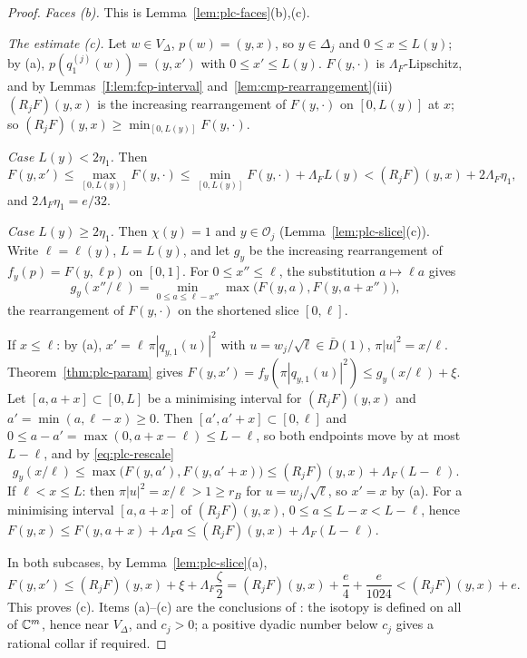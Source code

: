 \begin{proof}
\emph{Faces (b).} This is Lemma~\ref{lem:plc-faces}(b),(c).

\emph{The estimate (c).} Let $w\in V_\Delta$, $p(w)=(y,x)$, so $y\in\Delta_j$ and $0\le x\le L(y)$; by (a), $p(q^{(j)}_1(w))=(y,x')$ with $0\le x'\le L(y)$.
$F(y,\cdot)$ is $\Lambda_F$-Lipschitz, and by Lemmas~\ref{I:lem:fcp-interval} and~\ref{lem:cmp-rearrangement}(iii) $(R_jF)(y,x)$ is the increasing rearrangement of
$F(y,\cdot)$ on $[0,L(y)]$ at $x$; so $(R_jF)(y,x)\ge\min_{[0,L(y)]}F(y,\cdot)$.

\emph{Case $L(y)<2\eta_1$.} Then
\[
 F(y,x')\le\max_{[0,L(y)]}F(y,\cdot)\le\min_{[0,L(y)]}F(y,\cdot)+\Lambda_FL(y)<(R_jF)(y,x)+2\Lambda_F\eta_1,
\]
and $2\Lambda_F\eta_1=e/32$.

\emph{Case $L(y)\ge2\eta_1$.} Then $\chi(y)=1$ and $y\in\mathcal O_j$ (Lemma~\ref{lem:plc-slice}(c)). Write $\ell=\ell(y)$, $L=L(y)$, and let
$g_y$ be the increasing rearrangement of $f_y(p)=F(y,\ell p)$ on $[0,1]$. For $0\le x''\le\ell$, the substitution $a\mapsto\ell a$ gives
\begin{equation}\label{eq:plc-rescale}
 g_y(x''/\ell)=\min_{0\le a\le\ell-x''}\max\bigl(F(y,a),F(y,a+x'')\bigr),
\end{equation}
the rearrangement of $F(y,\cdot)$ on the shortened slice $[0,\ell]$.

If $x\le\ell$: by (a), $x'=\ell\,\pi|q_{y,1}(u)|^2$ with $u=w_j/\sqrt\ell\in\bar D(1)$, $\pi|u|^2=x/\ell$. Theorem~\ref{thm:plc-param} gives
$F(y,x')=f_y(\pi|q_{y,1}(u)|^2)\le g_y(x/\ell)+\xi$. Let $[a,a+x]\subset[0,L]$ be a minimising interval for $(R_jF)(y,x)$ and
$a'=\min(a,\ell-x)\ge0$. Then $[a',a'+x]\subset[0,\ell]$ and $0\le a-a'=\max(0,a+x-\ell)\le L-\ell$, so both
endpoints move by at most $L-\ell$, and by \eqref{eq:plc-rescale}
\[
 g_y(x/\ell)\le\max\bigl(F(y,a'),F(y,a'+x)\bigr)\le(R_jF)(y,x)+\Lambda_F(L-\ell).
\]
If $\ell<x\le L$: then $\pi|u|^2=x/\ell>1\ge r_B$ for $u=w_j/\sqrt\ell$, so $x'=x$ by (a). For a minimising interval $[a,a+x]$ of
$(R_jF)(y,x)$, $0\le a\le L-x<L-\ell$, hence $F(y,x)\le F(y,a+x)+\Lambda_Fa\le(R_jF)(y,x)+\Lambda_F(L-\ell)$.

In both subcases, by Lemma~\ref{lem:plc-slice}(a),
\[
 F(y,x')\le(R_jF)(y,x)+\xi+\Lambda_F\frac\zeta2=(R_jF)(y,x)+\frac e4+\frac e{1024}<(R_jF)(y,x)+e .
\]
This proves (c). Items (a)--(c) are the conclusions of : the isotopy is defined on all
of $\mathbb{C}^m$, hence near $V_\Delta$, and $c_j>0$; a positive dyadic number below $c_j$ gives a rational collar if required.
\end{proof}

